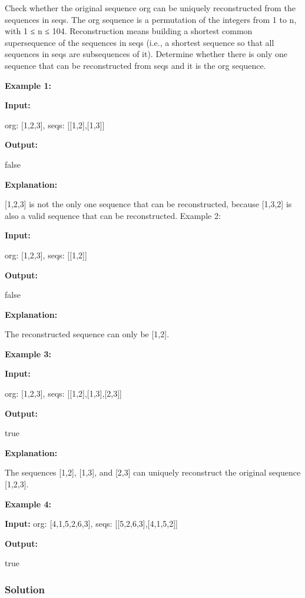 Check whether the original sequence org can be uniquely reconstructed from the sequences in seqs. The org sequence is a permutation of the integers from 1 to n, with 1 ≤ n ≤ 104. Reconstruction means building a shortest common supersequence of the sequences in seqs (i.e., a shortest sequence so that all sequences in seqs are subsequences of it). Determine whether there is only one sequence that can be reconstructed from seqs and it is the org sequence.

\textbf{Example 1:}

\textbf{Input:}

org: [1,2,3], seqs: [[1,2],[1,3]]

\textbf{Output:}

false

\textbf{Explanation:}

[1,2,3] is not the only one sequence that can be reconstructed, because [1,3,2] is also a valid sequence that can be reconstructed.
Example 2:

\textbf{Input:}

org: [1,2,3], seqs: [[1,2]]

\textbf{Output:}

false

\textbf{Explanation:}

The reconstructed sequence can only be [1,2].

\textbf{Example 3:}

\textbf{Input:}

org: [1,2,3], seqs: [[1,2],[1,3],[2,3]]

\textbf{Output:}

true

\textbf{Explanation:}

The sequences [1,2], [1,3], and [2,3] can uniquely reconstruct the original sequence [1,2,3].

\textbf{Example 4:}

\textbf{Input:}
org: [4,1,5,2,6,3], seqs: [[5,2,6,3],[4,1,5,2]]

\textbf{Output:}

true

\newpage

\subsubsection{Solution}

\begin{Code}

\end{Code}

